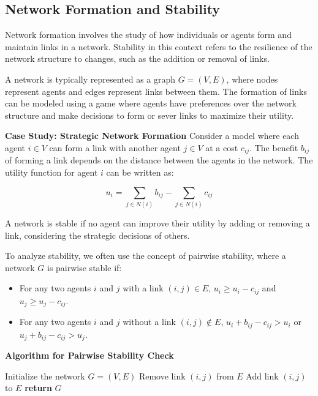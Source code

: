 \documentclass[12pt]{book} %
\begin{document}
\subsection{Network Formation and Stability}
Network formation involves the study of how individuals or agents form and maintain links in a network. Stability in this context refers to the resilience of the network structure to changes, such as the addition or removal of links.

A network is typically represented as a graph $G = (V, E)$, where nodes represent agents and edges represent links between them. The formation of links can be modeled using a game where agents have preferences over the network structure and make decisions to form or sever links to maximize their utility.

\textbf{Case Study: Strategic Network Formation}
Consider a model where each agent $i \in V$ can form a link with another agent $j \in V$ at a cost $c_{ij}$. The benefit $b_{ij}$ of forming a link depends on the distance between the agents in the network. The utility function for agent $i$ can be written as:

\[
u_i = \sum_{j \in N(i)} b_{ij} - \sum_{j \in N(i)} c_{ij}
\]

A network is stable if no agent can improve their utility by adding or removing a link, considering the strategic decisions of others.

To analyze stability, we often use the concept of pairwise stability, where a network $G$ is pairwise stable if:

\begin{itemize}
    \item For any two agents $i$ and $j$ with a link $(i, j) \in E$, $u_i \geq u_i - c_{ij}$ and $u_j \geq u_j - c_{ij}$.
    \item For any two agents $i$ and $j$ without a link $(i, j) \notin E$, $u_i + b_{ij} - c_{ij} > u_i$ or $u_j + b_{ij} - c_{ij} > u_j$.
\end{itemize}

\textbf{Algorithm for Pairwise Stability Check}
\begin{algorithm}
\caption{Pairwise Stability Check}
\begin{algorithmic}[1]
\State Initialize the network $G = (V, E)$
            \State Remove link $(i, j)$ from $E$
        \EndIf
    \Else
            \State Add link $(i, j)$ to $E$
        \EndIf
    \EndIf
\EndFor
\State \textbf{return} $G$
\end{algorithmic}
\end{algorithm}
\FloatBarrier
\end{document}
